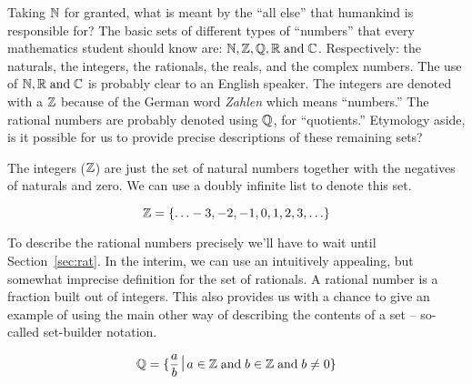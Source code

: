 Taking ${\mathbb N}$ for granted, what is meant by the ``all else''
that humankind is responsible for?  The basic sets of different types
of ``numbers'' that every mathematics student should know are: ${\mathbb N},
{\mathbb Z}, {\mathbb Q}, {\mathbb R}
\; \mbox{and} \; {\mathbb C}$.  Respectively: the naturals, the integers, the
rationals, the reals, and the complex numbers.  The use of ${\mathbb N},
{\mathbb R} \; \mbox{and} \; {\mathbb C}$ is probably clear to an English
speaker.  The integers are denoted with a ${\mathbb Z}$ because of the
German word {\em Zahlen} which means ``numbers.''   The rational numbers are
probably denoted using ${\mathbb Q}$, for ``quotients.''  Etymology
aside, is it possible for us to provide precise descriptions of these
remaining sets?  

The  integers (${\mathbb Z}$) are just the set of natural numbers
together with the negatives of naturals and zero.  We can use
a doubly infinite list to denote this set.

\[ {\mathbb Z} = \{ \ldots -3, -2, -1, 0, 1, 2, 3, \ldots \} \]


To describe the  rational numbers precisely we'll have to wait until Section~\ref{sec:rat}.
In the interim, we can use an intuitively appealing, but somewhat imprecise
definition for the set of rationals.  A rational number is a fraction built out
of integers.   This also provides us with
a chance to give an example of using the main other way of describing
the contents of a set -- so-called  set-builder notation.

\[ \Rationals = \{ \frac{a}{b} \suchthat a \in \Integers \; \mbox{and} \;
b \in \Integers \; \mbox{and} \; b \neq 0 \} \]

